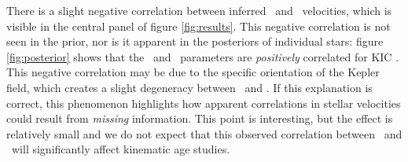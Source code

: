 There is a slight negative correlation between inferred \vy\ and \vz\
velocities, which is visible in the central panel of figure \ref{fig:results}.
This negative correlation is not seen in the prior, nor is it apparent in the
posteriors of individual stars: figure \ref{fig:posterior} shows that the \vy\
and \vz\ parameters are {\it positively} correlated for KIC \kicstar.
This negative correlation may be due to the specific orientation of the Kepler
field, which creates a slight degeneracy between \vy\ and \vz.
If this explanation is correct, this phenomenon highlights how apparent
correlations in stellar velocities could result from {\it missing}
information.
This point is interesting, but the effect is relatively small and we do not
expect that this observed correlation between \vz\ and \vy\ will significantly
affect kinematic age studies.


